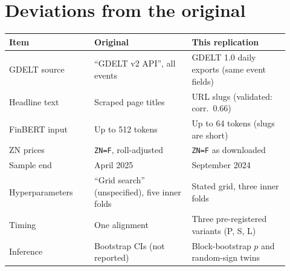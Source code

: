 \documentclass[11pt]{article}
\begin{document}
\appendix
\section{Deviations from the original}\label{tab:deviations}
\begin{tabular}{L{0.28\linewidth}L{0.32\linewidth}L{0.32\linewidth}}\toprule
Item & Original & This replication\\\midrule
GDELT source & ``GDELT v2 API'', all events & GDELT 1.0 daily exports (same event fields)\\
Headline text & Scraped page titles & URL slugs (validated: corr.\ 0.66)\\
FinBERT input & Up to 512 tokens & Up to 64 tokens (slugs are short)\\
ZN prices & \texttt{ZN=F}, roll-adjusted & \texttt{ZN=F} as downloaded\\
Sample end & April 2025 & September 2024\\
Hyperparameters & ``Grid search'' (unspecified), five inner folds & Stated grid, three inner folds\\
Timing & One alignment & Three pre-registered variants (P, S, L)\\
Inference & Bootstrap CIs (not reported) & Block-bootstrap $p$ and random-sign twins\\\bottomrule
\end{tabular}
\end{document}
